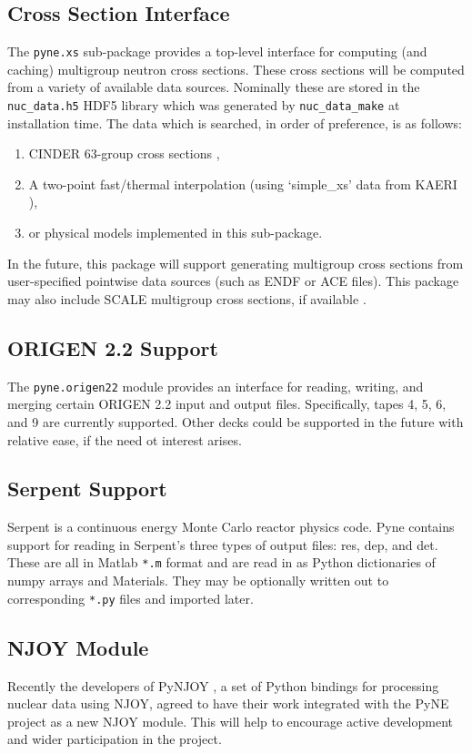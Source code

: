 \documentclass{anstrans}
\begin{document}
\subsection{Cross Section Interface} 
The \texttt{pyne.xs} sub-package provides a top-level interface for computing 
(and caching) multigroup neutron cross sections. These cross sections will be 
computed from a variety of available data sources.  Nominally these are stored 
in the \texttt{nuc\_data.h5} HDF5 library which was generated by \texttt{nuc\_data\_make}
at installation time.  The data which is searched, in order of preference, is as 
follows: 

\begin{enumerate}
    \item CINDER 63-group cross sections \cite{cinder},
    \item A two-point fast/thermal interpolation (using `simple\_xs' data from KAERI \cite{kaeri}),
    \item or physical models implemented in this sub-package.
\end{enumerate}

In the future, this package will support generating multigroup cross sections 
from user-specified pointwise data sources (such as ENDF or ACE files).  This 
package may also include SCALE multigroup cross sections, if available \cite{scale}.


\subsection{ORIGEN 2.2 Support}
The \texttt{pyne.origen22} module provides an interface for reading, writing, and 
merging certain ORIGEN 2.2 \cite{origen} input and output files.  Specifically, 
tapes 4, 5, 6, and 9 are currently supported.  Other decks could be supported in 
the future with relative ease, if the need ot interest arises.


\subsection{Serpent Support} 
Serpent \cite{serpent} is a continuous energy Monte Carlo reactor physics code.  
Pyne contains support for reading in Serpent's three types of output files: 
res, dep, and det.  These are all in Matlab \texttt{*.m} format and are read in 
as Python dictionaries of numpy arrays and Materials.  They may be optionally 
written out to corresponding \texttt{*.py} files and imported later.

\subsection{NJOY Module}
Recently the developers of PyNJOY \cite{dragon}, a set of Python bindings for processing
nuclear data using NJOY, agreed to have their work integrated with the PyNE
project as a new NJOY module. This will help to encourage active development and
wider participation in the project.
\end{document}
